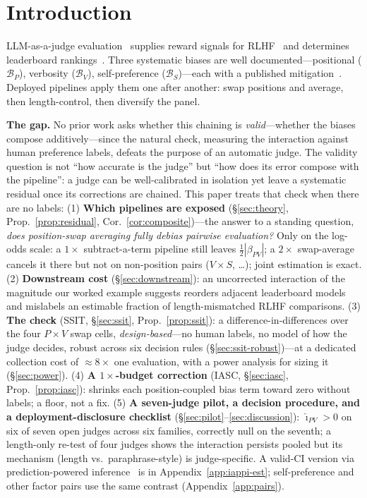 \documentclass{article}
\newcommand{\BP}{\mathcal{B}_P}
\newcommand{\BV}{\mathcal{B}_V}
\newcommand{\BS}{\mathcal{B}_S}
\begin{document}
\section{Introduction}
\label{sec:intro}

LLM-as-a-judge evaluation~\cite{zheng2023judging,gu2024survey}
supplies reward signals for RLHF~\cite{sharma2023sycophancy} and
determines leaderboard rankings~\cite{dubois2024length}. Three
systematic biases are well documented---positional ($\BP$),
verbosity ($\BV$), self-preference ($\BS$)---each with a published
mitigation~\cite{zheng2023judging,dubois2024length,panickssery2024llm}.
Deployed pipelines apply them one after another: swap positions and
average, then length-control, then diversify the panel.

\textbf{The gap.} No prior work asks whether this chaining is
\emph{valid}---whether the biases compose additively---since the
natural check, measuring the interaction against human preference
labels, defeats the purpose of an automatic judge. The validity
question is not ``how accurate is the judge'' but ``how does its
error compose with the pipeline'': a judge can be well-calibrated in
isolation yet leave a systematic residual once its corrections are
chained. This paper treats that check when there are no labels:
(1) \textbf{Which pipelines are exposed} (\S\ref{sec:theory},
Prop.~\ref{prop:residual}, Cor.~\ref{cor:composite})---the answer to
a standing question, \emph{does position-swap averaging fully
debias pairwise evaluation?} Only on the log-odds scale: a
$1\times$ subtract-a-term pipeline still leaves
$\tfrac12|\beta_{PV}|$; a $2\times$ swap-average cancels it there
but not on non-position pairs ($V{\times}S$, \dots); joint
estimation is exact. (2) \textbf{Downstream cost}
(\S\ref{sec:downstream}): an uncorrected interaction of the
magnitude our worked example suggests reorders adjacent leaderboard
models and mislabels an estimable fraction of length-mismatched
RLHF comparisons. (3) \textbf{The check} (SSIT, \S\ref{sec:ssit},
Prop.~\ref{prop:ssit}): a difference-in-differences over the four
$P{\times}V$ swap cells, \emph{design-based}---no human labels, no
model of how the judge decides, robust across six decision rules
(\S\ref{sec:ssit-robust})---at a dedicated collection cost of
${\approx}8\times$ one evaluation, with a power analysis for sizing
it (\S\ref{sec:power}). (4) \textbf{A $1\times$-budget correction}
(IASC, \S\ref{sec:iasc}, Prop.~\ref{prop:iasc}): shrinks each
position-coupled bias term toward zero without labels; a floor, not
a fix. (5) \textbf{A seven-judge pilot, a decision procedure, and a
deployment-disclosure checklist}
(\S\ref{sec:pilot}--\ref{sec:discussion}): $\hat\imath_{PV}>0$ on
six of seven open judges across six families, correctly null on the
seventh; a length-only re-test of four judges shows the interaction
persists pooled but its mechanism (length vs.\ paraphrase-style) is
judge-specific.
A valid-CI version via prediction-powered
inference~\cite{ppi_ranking2026,eif_judge2026} is in
Appendix~\ref{app:iappi-est}; self-preference and other factor pairs
use the same contrast (Appendix~\ref{app:pairs}).
\end{document}
